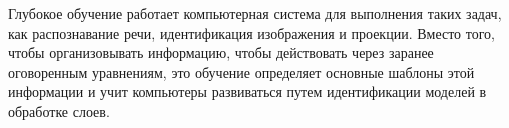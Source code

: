 \begin{frame}

    Глубокое обучение работает компьютерная система для выполнения таких задач,
    как распознавание речи, идентификация изображения и проекции.
    Вместо того, чтобы организовывать информацию, чтобы действовать через заранее оговоренным уравнениям,
    это обучение определяет основные шаблоны этой информации и
    учит компьютеры развиваться путем идентификации моделей в обработке слоев.

\end{frame}